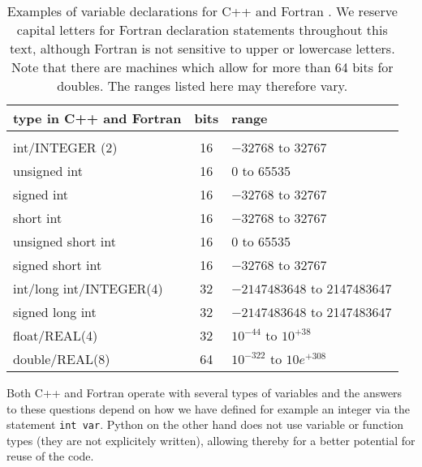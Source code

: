 \begin{table}[hbtp]
\caption{Examples of variable declarations for C++ and Fortran . We reserve capital
letters for Fortran  declaration statements throughout this text, although Fortran  is
not sensitive to upper or lowercase letters. Note that there are machines which allow for more than 64 bits 
for doubles. The ranges listed here may therefore vary. \label{tab:listofdeclar} }
\begin{center}
\begin{tabular}{lcl}\hline \hline
\hspace*{\fill} type in C++ and Fortran  \hspace*{\fill}
&\hspace*{\fill} bits \hspace*{\fill}
&\hspace*{\fill} range \hspace*{\fill} \\ \hline
& & \\[-2mm]
int/INTEGER (2) & 16 & $-32768$ to 32767\\
unsigned int & 16 & 0 to 65535\\
signed int & 16 & $-32768$ to 32767\\
short int & 16 & $-32768$ to 32767\\
unsigned short int & 16 & 0 to 65535\\
signed short int & 16 & $-32768$ to 32767\\
int/long int/INTEGER(4) & 32 & $-2147483648$ to 2147483647\\
signed long int & 32 & $-2147483648$ to 2147483647\\
float/REAL(4) & 32 & $10^{-44}$ to $10^{+38}$\\
double/REAL(8) & 64 & $10^{-322}$ to $10e^{+308}$\\\hline\hline
\end{tabular}
\end{center}
\end{table}

Both C++ and Fortran  operate with several types of 
variables and the answers to these questions depend on how
we have defined for example an integer via the statement {\tt int var}. 
Python on the other hand does not use variable or function types (they are not explicitely written),
allowing thereby for a better potential for reuse of the code. 

